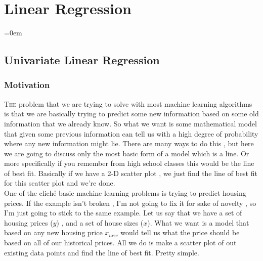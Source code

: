 

%


\onecolumn
\section{Linear Regression}
\label{sec:linear_regression}
\parindent=0em

\subsection{Univariate Linear Regression}
\label{ssec:univariate_linear_regression}

\subsubsection{Motivation}
\label{sssec:motivation}


\lettrine[lines=3, findent=3pt, nindent=0pt]{T}{he} problem that we are trying
to solve with most machine learning algorithms is that we are basically trying
to predict some new information based on some old information that we already
know. So what we want is some mathematical model that given some previous
information can tell us with a high degree of probability where any new
information might lie. There are many ways to do this , but here we are going to
discuss only the most basic form of a model which is a line. Or more
specifically if you remember from high school classes this would be the line of
best fit. Basically if we have a 2-D scatter plot , we just find the line of
best fit for this scatter plot and we're done.\\

One of the cliché basic machine learning problems is trying to predict housing
prices. If the example isn't broken , I'm not going to fix it for sake of novelty
, so I'm just going to stick to the same example. Let us say that we have a set
of housing prices ($y$) , and a set of house sizes ($x$). What we want is a
model that based on any new housing price $x_{new}$ would tell us what the price
should be based on all of our historical prices. All we do is make a scatter
plot of out existing data points and find the line of best fit. Pretty
simple.\\

